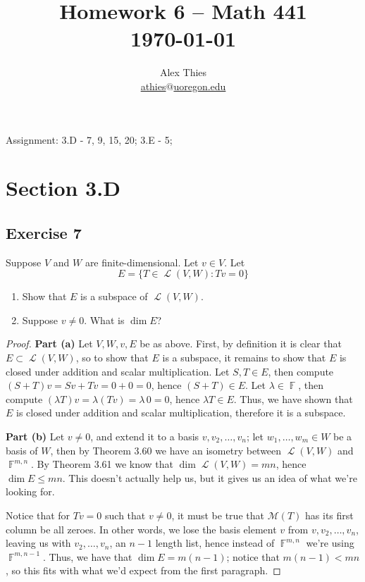 \documentclass[letterpaper, 12pt]{amsart}
\DeclareMathOperator{\F}{\mathbb{F}}
\DeclareMathOperator{\Ell}{\mathscr{L}}
\theoremstyle{definition}  %
\begin{document}
	\title{Homework 6  -- Math 441 \\ \today}
	\author{Alex Thies \\ \href{mailto:athies@uoregon.edu}{\lowercase{athies$@$uoregon.edu}}}

	\maketitle

	Assignment: 3.D - 7, 9, 15, 20; 3.E - 5;

	\section*{Section 3.D}
		\subsection*{Exercise 7}
		Suppose $V$ and $W$ are finite-dimensional. 
		Let $v \in V$. 
		Let $$E = \{ T \in \Ell(V,W) : Tv = 0 \}$$
		\begin{enumerate}[\hspace{5mm} (a)]
			\item Show that $E$ is a subspace of $\Ell(V,W)$.
			\item Suppose $v \neq 0$. What is $\dim E$?
		\end{enumerate}
		
		\begin{proof}
			\textbf{Part (a)}
			Let $V,W,v,E$ be as above.
			First, by definition it is clear that $E \subset \Ell(V,W)$, so to show that $E$ is a subspace, it remains to show that $E$ is closed under addition and scalar multiplication.
			Let $S,T \in E$, then compute $(S+T)v = Sv + Tv = 0 + 0 = 0$, hence $(S+T) \in E$.
			Let $\lambda \in \F$, then compute $(\lambda T)v = \lambda (Tv) = \lambda \, 0 = 0$, hence $\lambda T \in E$.
			Thus, we have shown that $E$ is closed under addition and scalar multiplication, therefore it is a subspace.
			
			\textbf{Part (b)}
			Let $v \neq 0$, and extend it to a basis $v, v_{2}, \dots, v_{n}$; let $w_{1}, \dots, w_{m} \in W$ be a basis of $W$, then by Theorem 3.60 we have an isometry between $\Ell(V,W)$ and $\F^{m,n}$. 
			By Theorem 3.61 we know that $\dim{\Ell(V,W)} = mn$, hence $\dim{E} \leq mn$.
			This doesn't actually help us, but it gives us an idea of what we're looking for.

			Notice that for $Tv = 0$ such that $v \neq 0$, it must be true that $\mathcal{M}(T)$ has its first column be all zeroes.
			In other words, we lose the basis element $v$ from $v, v_{2}, \dots, v_{n}$, leaving us with $v_{2}, \dots, v_{n}$, an $n-1$ length list, hence instead of $\F^{m,n}$ we're using $\F^{m,n-1}$.
			Thus, we have that $\dim E = m(n-1)$; notice that $m(n-1) < mn$, so this fits with what we'd expect from the first paragraph.
		\end{proof}
\end{document}
